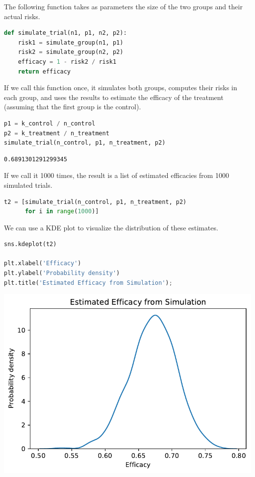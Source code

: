 The following function takes as parameters the size of the two groups
and their actual risks.

\begin{lstlisting}[language=Python,style=source]
def simulate_trial(n1, p1, n2, p2):
    risk1 = simulate_group(n1, p1)
    risk2 = simulate_group(n2, p2)
    efficacy = 1 - risk2 / risk1
    return efficacy
\end{lstlisting}

If we call this function once, it simulates both groups, computes their
risks in each group, and uses the results to estimate the efficacy of
the treatment (assuming that the first group is the control).

\begin{lstlisting}[language=Python,style=source]
p1 = k_control / n_control
p2 = k_treatment / n_treatment
simulate_trial(n_control, p1, n_treatment, p2)
\end{lstlisting}

\begin{lstlisting}[style=output]
0.6891301291299345
\end{lstlisting}

If we call it 1000 times, the result is a list of estimated efficacies
from 1000 simulated trials.

\begin{lstlisting}[language=Python,style=source]
t2 = [simulate_trial(n_control, p1, n_treatment, p2)
      for i in range(1000)]
\end{lstlisting}

We can use a KDE plot to visualize the distribution of these estimates.

\begin{lstlisting}[language=Python,style=source]
sns.kdeplot(t2)

plt.xlabel('Efficacy')
plt.ylabel('Probability density')
plt.title('Estimated Efficacy from Simulation');
\end{lstlisting}

\begin{center}
\includegraphics[scale=0.75]{11_resampling_files/11_resampling_45_0.pdf}
\end{center}

